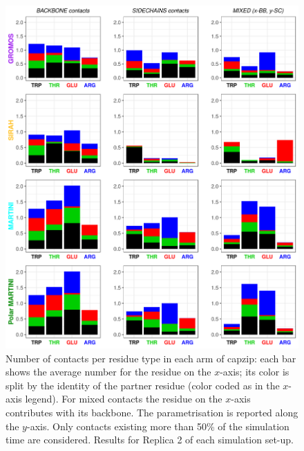 \begin{figure}[p!]
\centering
\includegraphics[width=0.95\linewidth]{3results_capsule/pics/R2_new_rep1_allFF.png}
\caption[(SI) Replica 2: Contacts between buckyball molecules]{Number of contacts per residue type in each arm of capzip: each bar shows the average number for the residue on the $x$-axis; its color is split by the identity of the partner residue (color coded as in the $x$-axis legend). For mixed contacts the residue on the $x$-axis contributes with its backbone. The parametrisation is reported along the $y$-axis. Only contacts existing more than 50\% of the simulation time are considered. Results for Replica 2 of each simulation set-up.}
\label{fig:BTI_cont2}
\end{figure}

